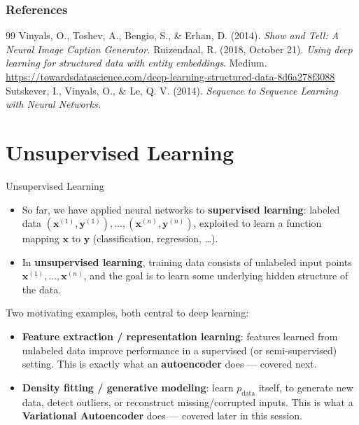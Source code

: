 \begin{vbframe}
\frametitle{References}
\footnotesize{
\begin{thebibliography}{99}
 Vinyals, O., Toshev, A., Bengio, S., \& Erhan, D. (2014). \textit{Show and Tell: A Neural Image Caption Generator.}
 Ruizendaal, R. (2018, October 21). \textit{Using deep learning for structured data with entity embeddings}. Medium. \url{https://towardsdatascience.com/deep-learning-structured-data-8d6a278f3088}
 Sutskever, I., Vinyals, O., \& Le, Q. V. (2014). \textit{Sequence to Sequence Learning with Neural Networks.}
\end{thebibliography}
}
\end{vbframe}

\section{Unsupervised Learning}

\begin{vbframe}{Unsupervised Learning}
  \begin{itemize}
    \item So far, we have applied neural networks to \textbf{supervised learning}: labeled data $(\pmb{x}^{(1)}, \pmb{y}^{(1)}), \dots, (\pmb{x}^{(n)}, \pmb{y}^{(n)})$, exploited to learn a function mapping $\pmb{x}$ to $\pmb{y}$ (classification, regression, \ldots).
    \item In \textbf{unsupervised learning}, training data consists of unlabeled input points $\pmb{x}^{(1)}, \dots, \pmb{x}^{(n)}$, and the goal is to learn some underlying hidden structure of the data.
  \end{itemize}
\framebreak
Two motivating examples, both central to deep learning:
  \begin{itemize}
    \item[] \textbf{Feature extraction / representation learning}: features learned from unlabeled data improve performance in a supervised (or semi-supervised) setting. This is exactly what an \textbf{autoencoder} does --- covered next.
    \item[] \textbf{Density fitting / generative modeling}: learn $p_{\text{data}}$ itself, to generate new data, detect outliers, or reconstruct missing/corrupted inputs. This is what a \textbf{Variational Autoencoder} does --- covered later in this session.
  \end{itemize}
\end{vbframe}

